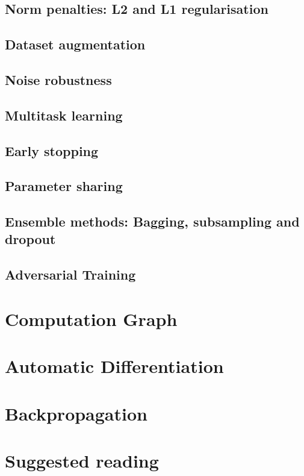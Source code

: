 \subsection{Norm penalties: L2 and L1 regularisation}
\subsection{Dataset augmentation}
\subsection{Noise robustness}
\subsection{Multitask learning}
\subsection{Early stopping}
\subsection{Parameter sharing}
\subsection{Ensemble methods: Bagging, subsampling and dropout}
\subsection{Adversarial Training}

\section{Computation Graph}



\section{Automatic Differentiation}







\section{Backpropagation}

\section{Suggested reading}

